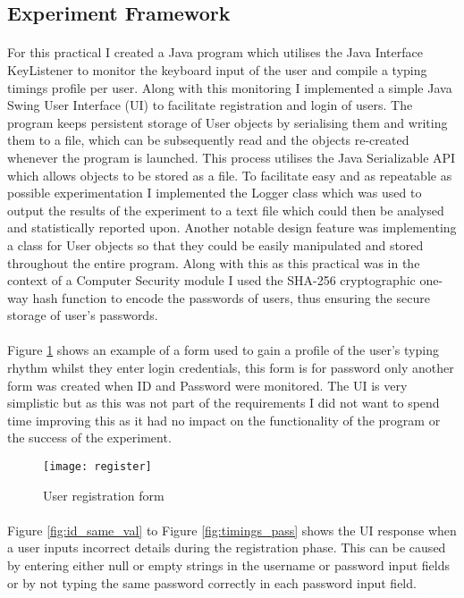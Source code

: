 \documentclass{article}
\begin{document}
\subsection{Experiment Framework} \label{setup}
\paragraph{}
For this practical I created a Java program which utilises the Java Interface KeyListener to monitor the keyboard input of the user and compile a typing timings profile per user. Along with this monitoring I implemented a simple Java Swing User Interface (UI) to facilitate registration and login of users. The program keeps persistent storage of User objects by serialising them and writing them to a file, which can be subsequently read and the objects re-created whenever the program is launched. This process utilises the Java Serializable API which allows objects to be stored as a file. To facilitate easy and as repeatable as possible experimentation I implemented the Logger class which was used to output the results of the experiment to a text file which could then be analysed and statistically reported upon. Another notable design feature was implementing a class for User objects so that they could be easily manipulated and stored throughout the entire program. Along with this as this practical was in the context of a Computer Security module I used the SHA-256 cryptographic one-way hash function to encode the passwords of users, thus ensuring the secure storage of user's passwords.       
\paragraph{}
Figure \ref{fig:register} shows an example of a form used to gain a profile of the user's typing rhythm  whilst they enter login credentials, this form is for password only another form was created when ID and Password were monitored. The UI is very simplistic but as this was not part of the requirements I did not want to spend time improving this as it had no impact on the functionality of the program or the success of the experiment. 

\begin{figure}[H]
    \centering
    \texttt{[image: register]}
    \caption{User registration form}
    \label{fig:register}
\end{figure}

\paragraph{}
Figure \ref{fig:id_same_val} to Figure \ref{fig:timings_pass} shows the UI response when a user inputs incorrect details during the registration phase. This can be caused by entering either null or empty strings in the username or password input fields or by not typing the same password correctly in each password input field. 
\end{document}
